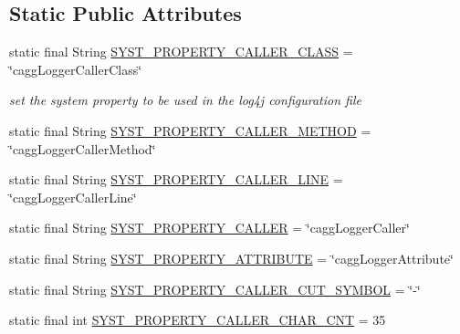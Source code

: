 \subsection*{Static Public Attributes}
\begin{DoxyCompactItemize}
\item 
static final String \hyperlink{classit_1_1emarolab_1_1cagg_1_1debugging_1_1DebuggingText_1_1Log4j_a54d1c75011734466e3194aa53e33c6cf}{S\-Y\-S\-T\-\_\-\-P\-R\-O\-P\-E\-R\-T\-Y\-\_\-\-C\-A\-L\-L\-E\-R\-\_\-\-C\-L\-A\-S\-S} = \char`\"{}cagg\-Logger\-Caller\-Class\char`\"{}
\begin{DoxyCompactList}\small\item\em set the system property to be used in the log4j configuration file \end{DoxyCompactList}\item 
static final String \hyperlink{classit_1_1emarolab_1_1cagg_1_1debugging_1_1DebuggingText_1_1Log4j_a142198cde93bd152b90429bec42beeb2}{S\-Y\-S\-T\-\_\-\-P\-R\-O\-P\-E\-R\-T\-Y\-\_\-\-C\-A\-L\-L\-E\-R\-\_\-\-M\-E\-T\-H\-O\-D} = \char`\"{}cagg\-Logger\-Caller\-Method\char`\"{}
\item 
static final String \hyperlink{classit_1_1emarolab_1_1cagg_1_1debugging_1_1DebuggingText_1_1Log4j_a58f85fd88410fbdc6439f10d9bd5f642}{S\-Y\-S\-T\-\_\-\-P\-R\-O\-P\-E\-R\-T\-Y\-\_\-\-C\-A\-L\-L\-E\-R\-\_\-\-L\-I\-N\-E} = \char`\"{}cagg\-Logger\-Caller\-Line\char`\"{}
\item 
static final String \hyperlink{classit_1_1emarolab_1_1cagg_1_1debugging_1_1DebuggingText_1_1Log4j_a1f8efd57eea29c6c3576cf208f04f0c1}{S\-Y\-S\-T\-\_\-\-P\-R\-O\-P\-E\-R\-T\-Y\-\_\-\-C\-A\-L\-L\-E\-R} = \char`\"{}cagg\-Logger\-Caller\char`\"{}
\item 
static final String \hyperlink{classit_1_1emarolab_1_1cagg_1_1debugging_1_1DebuggingText_1_1Log4j_a0b246fe5a53ea6edfa36f8748fff4f8e}{S\-Y\-S\-T\-\_\-\-P\-R\-O\-P\-E\-R\-T\-Y\-\_\-\-A\-T\-T\-R\-I\-B\-U\-T\-E} = \char`\"{}cagg\-Logger\-Attribute\char`\"{}
\item 
static final String \hyperlink{classit_1_1emarolab_1_1cagg_1_1debugging_1_1DebuggingText_1_1Log4j_a94fc0a2f416288abc4d7c13a6534c359}{S\-Y\-S\-T\-\_\-\-P\-R\-O\-P\-E\-R\-T\-Y\-\_\-\-C\-A\-L\-L\-E\-R\-\_\-\-C\-U\-T\-\_\-\-S\-Y\-M\-B\-O\-L} = \char`\"{}-\/\char`\"{}
\item 
static final int \hyperlink{classit_1_1emarolab_1_1cagg_1_1debugging_1_1DebuggingText_1_1Log4j_a4d254a48cfd5a977e6bb61f8f821f671}{S\-Y\-S\-T\-\_\-\-P\-R\-O\-P\-E\-R\-T\-Y\-\_\-\-C\-A\-L\-L\-E\-R\-\_\-\-C\-H\-A\-R\-\_\-\-C\-N\-T} = 35

\end{DoxyCompactItemize}
